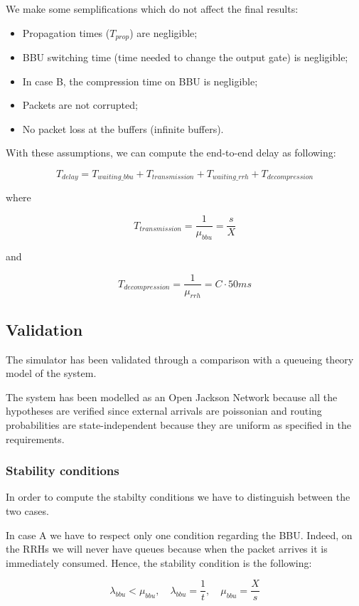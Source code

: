 \documentclass[11pt,a4paper,oneside, openright]{article}
\begin{document}
We make some semplifications which do not affect the final results:
\begin{itemize}
    \item Propagation times ($ T_{prop} $) are negligible;
    \item BBU switching time (time needed to change the output gate) is negligible;
    \item In case B, the compression time on BBU is negligible;
    \item Packets are not corrupted;
    \item No packet loss at the buffers (infinite buffers).
\end{itemize}

With these assumptions, we can compute the end-to-end delay as following:

$$ T_{delay} =  T_{waiting\_bbu} + T_{transmission} + T_{waiting\_rrh} + T_{decompression} $$

where 

$$ T_{transmission} = \frac{1}{\mu_{bbu}} = \frac{s}{X} $$

and

$$ T_{decompression} = \frac{1}{\mu_{rrh}} = C \cdot 50ms $$

\subsection{Validation}
The simulator has been validated through a comparison with a queueing theory model of the system.

The system has been modelled as an Open Jackson Network because all the hypotheses are verified since external arrivals are poissonian and routing probabilities are state-independent because they are uniform as specified in the requirements.

\subsubsection{Stability conditions}
In order to compute the stabilty conditions we have to distinguish between the two cases.

In case A we have to respect only one condition regarding the BBU. Indeed, on the RRHs we will never have queues because when the packet arrives it is immediately consumed.
Hence, the stability condition is the following:

$$ \lambda_{bbu} < \mu_{bbu}, \quad \lambda_{bbu} = \frac{1}{t}, \quad \mu_{bbu} = \frac{X}{s}$$
\end{document}
